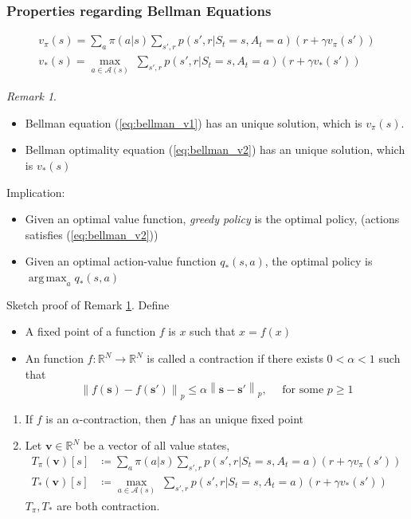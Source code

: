 \documentclass[10pt]{beamer}
\newcommand\norm[1]{\left\lVert#1\right\rVert}
\DeclareMathOperator*{\argmax}{arg\,max}
\theoremstyle{remark}
\newtheorem{remark}{Remark}[section]
\begin{document}
\begin{frame}
    \frametitle{Properties regarding Bellman Equations}
    \begin{gather}
        \label{eq:bellman_v1}
         v_\pi(s) = \sum_{a} \pi(a|s) \sum_{s', r} p(s', r| S_t = s, A_t = a) \left( r + \gamma v_\pi(s') \right)  \\
        \label{eq:bellman_v2}
        v_{\ast}(s) = \max_{a \in \mathcal{A}(s)} \; \sum_{s', r} p(s', r|  S_t =s, A_t = a)  \left( r + \gamma v_{\ast} (s') \right)
    \end{gather}
    \begin{remark}
        \label{remark:bellman}
        \begin{itemize}
            \item Bellman equation (\ref{eq:bellman_v1}) has an unique solution, which is $v_{\pi}(s)$.
            \item Bellman optimality equation (\ref{eq:bellman_v2}) has an unique solution, which is $v_\ast(s)$
        \end{itemize}
    \end{remark}
    Implication: 
    \begin{itemize}
        \item Given an optimal value function, \textit{greedy policy} is the optimal policy, (actions satisfies (\ref{eq:bellman_v2}))
        \item Given an optimal action-value function $q_{\ast}(s, a)$, the optimal policy is $ \argmax_{a} q_{\ast}(s, a)$
    \end{itemize}
\end{frame}

\begin{frame}
    Sketch proof of Remark \ref{remark:bellman}.
    Define 
    \begin{itemize}
    \item A fixed point of a function $f$ is  $x$ such that  $x = f(x)$
    \item An function $f: \mathbb{R}^{N} \rightarrow \mathbb{R}^{N}$ is called a contraction if there exists $0 < \alpha < 1$ such that
        \[
            \norm{f(\bm{s}) - f(\bm{s}')}_p \leq \alpha \norm{\bm{s} - \bm{s}'}_p, \quad \text{ for some $p \geq 1$}
        \] 
    \end{itemize}
    \begin{enumerate}
    \item If $f$ is an $\alpha$-contraction, then $f$ has an unique fixed point
    \item Let $\bm{v} \in \mathbb{R}^{N}$ be a vector of all value states, 
        \begin{align*}
            T_{\pi}(\bm{v})[s] &\coloneqq \sum_{a} \pi(a|s) \sum_{s', r} p(s', r| S_t = s, A_t = a) \left( r + \gamma v_\pi(s') \right)  \\
        T_{\ast}(\bm{v})[s] &\coloneqq \max_{a \in \mathcal{A}(s)} \; \sum_{s', r} p(s', r|  S_t =s, A_t = a)  \left( r + \gamma v_{\ast} (s') \right)
        \end{align*} 
        $T_{\pi}, T_{\ast}$ are both contraction.
    \end{enumerate}
\end{frame}
\end{document}
